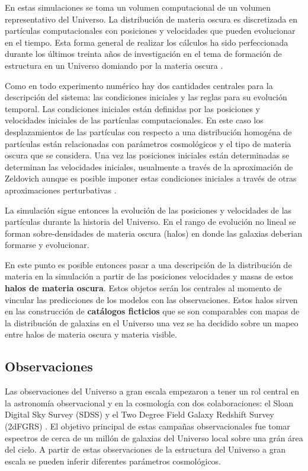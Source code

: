 En estas simulaciones se toma un volumen computacional de un volumen
representativo del Universo.
La distribuci\'on de materia oscura es discretizada en part\'iculas
computacionales con posiciones y velocidades que pueden evolucionar en
el tiempo.  
Esta forma general de realizar los c\'alculos ha sido
perfeccionada durante los \'ultimos treinta a\~nos de investigaci\'on
en el tema de formaci\'on de estructura en un Universo domiando por la
materia oscura
\cite{1985ApJ...292..371D,1999ApJ...522...82K,2005Natur.435..629S}. 

Como en todo experimento num\'erico hay dos cantidades centrales para
la descripci\'on del sistema: las condiciones iniciales y las reglas
para su evoluci\'on temporal.
Las condiciones iniciales est\'an definidas por las posiciones y velocidades
iniciales de las part\'iculas computacionales. 
En este caso los desplazamientos de las part\'iculas
con respecto a una distribuci\'on homog\'ena de part\'iculas están
relacionadas con parámetros cosmológicos y el tipo de materia oscura
que se considera.
Una vez las posiciones iniciales est\'an determinadas se
determinan las velocidades iniciales, usualmente a trav\'es de la
aproximaci\'on de Zeldovich aunque es posible imponer estas
condiciones iniciales a trav\'es de otras aproximaciones perturbativas
\cite{2014MNRAS.439.3630W}. 

La simulaci\'on sigue entonces la evoluci\'on de las posiciones y
velocidades de las part\'iculas durante la historia del
Universo. En el rango de evoluci\'on no lineal se forman
sobre-densidades de materia oscura (halos) en
donde  las galaxias deberian formarse y evolucionar. 

En este punto es posible entonces pasar a una
descripci\'on de la distribuci\'on de materia en la simulaci\'on a
partir de las posiciones  velocidades y masas de estos {\bf halos de materia
  oscura}. 
Estos objetos serán los centrales al momento de vincular
las predicciones de los modelos con las observaciones. 
Estos halos sirven en las construcci\'on de {\bf cat\'alogos
  ficticios} que se son comparables con mapas de la distribuci\'on de
galaxias en el Universo una vez se ha decidido sobre un mapeo entre
halos de materia oscura y materia visible. 


\subsection{Observaciones}

Las observaciones del Universo a gran escala empezaron a tener un rol
central en la astronom\'ia observacional y en la cosmolog\'ia con dos
colaboraciones: el Sloan Digital Sky Survey (SDSS) \cite{SDSS} y el Two Degree
Field Galaxy Redshift Survey (2dFGRS) \cite{2dF}. 
El objetivo principal de estas campa\~nas observacionales fue tomar
espectros de cerca de un mill\'on de galaxias del Universo local sobre
una gr\'an \'area del cielo. 
A partir de estas observaciones de la estructura del Universo a gran
escala se pueden inferir diferentes par\'ametros cosmol\'ogicos.

